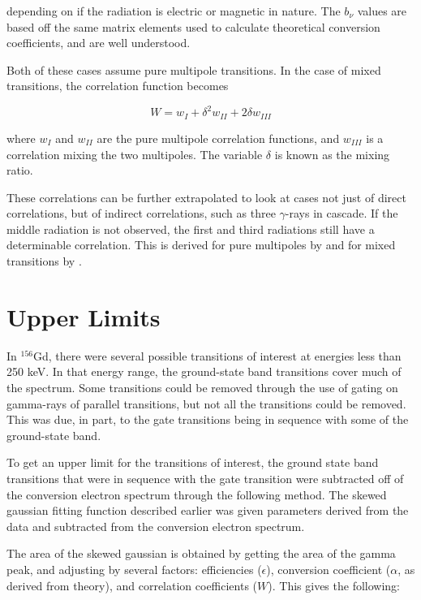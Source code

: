 depending on if the radiation is electric or magnetic in nature. The $b_\nu$ values are based off the same matrix elements used to calculate theoretical conversion coefficients, and are well understood\citep{rose51:_internal_conversion, rose52:_internal_conversion}.

Both of these cases assume pure multipole transitions. In the case of mixed transitions, the correlation function becomes

\begin{equation}
    W = w_I + \delta^2 w_{II} + 2\delta w_{III}
    \label{eq:mixed_corr}
\end{equation}

where $w_I$ and $w_{II}$ are the pure multipole correlation functions, and $w_{III}$ is a correlation mixing the two multipoles. The variable $\delta$ is known as the mixing ratio. 

These correlations can be further extrapolated to look at cases not just of direct correlations, but of indirect correlations, such as three $\gamma$-rays in cascade. If the middle radiation is not observed, the first and third radiations still have a determinable correlation. This is derived for pure multipoles by \citep{biedenharn53:_theory_angular_corr} and for mixed transitions by \citep{rose53:_angular_corr_supp,osborn53:_angular_corr_3}.

\section{Upper Limits}

In $^{156}$Gd, there were several possible transitions of interest at energies less than 250 keV. In that energy range, the ground-state band transitions cover much of the spectrum. Some transitions could be removed through the use of gating on gamma-rays of parallel transitions, but not all the transitions could be removed. This was due, in part, to the gate transitions being in sequence with some of the ground-state band. 

To get an upper limit for the transitions of interest, the ground state band transitions that were in sequence with the gate transition were subtracted off of the conversion electron spectrum through the following method. The skewed gaussian fitting function described earlier was given parameters derived from the data and subtracted from the conversion electron spectrum.

The area of the skewed gaussian is obtained by getting the area of the gamma peak, and adjusting by several factors: efficiencies ($\epsilon$), conversion coefficient ($\alpha$, as derived from theory), and correlation coefficients ($W$). This gives the following:

